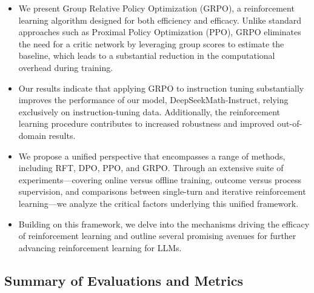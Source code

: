 \begin{itemize}[topsep=0pt]
    \item We present Group Relative Policy Optimization (GRPO), a reinforcement learning algorithm designed for both efficiency and efficacy. Unlike standard approaches such as Proximal Policy Optimization (PPO), GRPO eliminates the need for a critic network by leveraging group scores to estimate the baseline, which leads to a substantial reduction in the computational overhead during training.
    \item Our results indicate that applying GRPO to instruction tuning substantially improves the performance of our model, DeepSeekMath-Instruct, relying exclusively on instruction-tuning data. Additionally, the reinforcement learning procedure contributes to increased robustness and improved out-of-domain results.
    \item We propose a unified perspective that encompasses a range of methods, including RFT, DPO, PPO, and GRPO. Through an extensive suite of experiments—covering online versus offline training, outcome versus process supervision, and comparisons between single-turn and iterative reinforcement learning—we analyze the critical factors underlying this unified framework.
    \item Building on this framework, we delve into the mechanisms driving the efficacy of reinforcement learning and outline several promising avenues for further advancing reinforcement learning for LLMs.
\end{itemize}

\subsection{Summary of Evaluations and Metrics}

